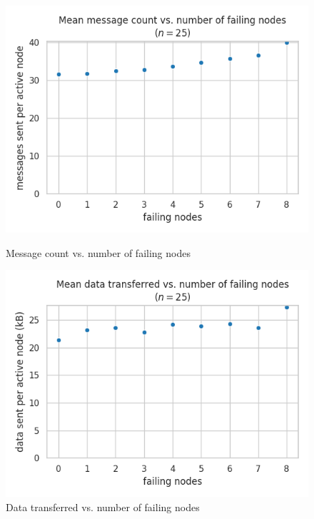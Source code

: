 \begin{figure}[H]
    \centering
    \begin{minipage}{0.5\textwidth}
        \centering
        \includegraphics[width=\textwidth]{figures/3/bandwidth_msg_tx_sum_by_failing.png}
        \captionsetup{labelformat=empty}
        \caption{Message count vs. number of failing nodes}
    \end{minipage}\hfill
    \begin{minipage}{0.5\textwidth}
        \centering
        \includegraphics[width=\textwidth]{figures/3/bandwidth_tx_sum_by_failing.png}
        \captionsetup{labelformat=empty}
        \caption{Data transferred vs. number of failing nodes}
    \end{minipage}\hfill
\end{figure}


